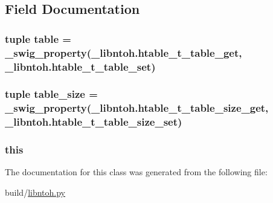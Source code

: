\subsection{Field Documentation}
\hypertarget{classlibntoh_1_1htable__t_a1d594eec83b20c2174ce4cfea11bdb6b}{
\subsubsection[{table}]{\setlength{\rightskip}{0pt plus 5cm}tuple table = {\bf \-\_\-swig\-\_\-property}(\-\_\-libntoh.\-htable\-\_\-t\-\_\-table\-\_\-get, \-\_\-libntoh.\-htable\-\_\-t\-\_\-table\-\_\-set)\hspace{0.3cm}{\ttfamily [static]}}}\label{classlibntoh_1_1htable__t_a1d594eec83b20c2174ce4cfea11bdb6b}
\hypertarget{classlibntoh_1_1htable__t_ad67ffd2dbd3d2f980bf246ac3108800d}{
\subsubsection[{table\-\_\-size}]{\setlength{\rightskip}{0pt plus 5cm}tuple table\-\_\-size = {\bf \-\_\-swig\-\_\-property}(\-\_\-libntoh.\-htable\-\_\-t\-\_\-table\-\_\-size\-\_\-get, \-\_\-libntoh.\-htable\-\_\-t\-\_\-table\-\_\-size\-\_\-set)\hspace{0.3cm}{\ttfamily [static]}}}\label{classlibntoh_1_1htable__t_ad67ffd2dbd3d2f980bf246ac3108800d}
\hypertarget{classlibntoh_1_1htable__t_a05c09a5e9d53fa7adf0a7936038c2fa3}{
\subsubsection[{this}]{\setlength{\rightskip}{0pt plus 5cm}this}}\label{classlibntoh_1_1htable__t_a05c09a5e9d53fa7adf0a7936038c2fa3}


The documentation for this class was generated from the following file\-:\begin{DoxyCompactItemize}
\item 
build/\hyperlink{libntoh_8py}{libntoh.\-py}\end{DoxyCompactItemize}
